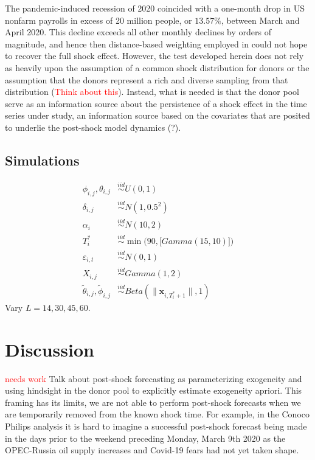 \documentclass[11pt]{article}
\def\mbf#1{\mathbf{#1}} %
\newcommand{\simiid}{\stackrel{iid}{\sim}} %
\theoremstyle{definition}
\begin{document}
The pandemic-induced recession of 2020 coincided with a one-month drop in US nonfarm payrolls in excess of 20 million people, or $13.57\%$, between March and April 2020.  This decline exceeds all other monthly declines by orders of magnitude, and hence then distance-based weighting employed in \citep{lin2021minimizing} could not hope to recover the full shock effect.  However, the test developed herein does not rely as heavily upon the assumption of a common shock distribution for donors or the assumption that the donors represent a rich and diverse sampling from that distribution (\textcolor{red}{Think about this}).  Instead, what is needed is that the donor pool serve as an information source about the persistence of a shock effect in the time series under study, an information source based on the covariates that are posited to underlie the post-shock model dynamics (?).  


\subsection{Simulations}
\label{simulation}


\begin{align*}
	\phi_{i,j}, \theta_{i,j}  & \simiid U(0,1) \\ 
	\delta_{i,j} & \simiid N(1,0.5^2) \\
	\alpha_i & \simiid N(10, 2) \\
	T_i^* & \simiid \min\Big(90, \big[Gamma(15,10)\big]\Big) \\
	\varepsilon_{i,t} & \simiid N(0,1)\\
	X_{i,j} & \simiid Gamma(1,2) \\
	\tilde{\theta}_{i,j},\tilde{\phi}_{i,j} & \simiid Beta(\|\mbf{x}_{i,T_i^*+1}\|,1)
\end{align*}
Vary $L = 14, 30, 45,60$.



\section{Discussion}

\textcolor{red}{needs work} Talk about post-shock forecasting as parameterizing exogeneity and using hindsight in the donor pool to explicitly estimate exogeneity apriori. This framing has its limits, we are not able to perform post-shock forecasts when we are temporarily removed from the known shock time. For example, in the Conoco Philips analysis it is hard to imagine a successful post-shock forecast being made in the days prior to the weekend preceding Monday, March 9th 2020 as the OPEC-Russia oil supply increases and Covid-19 fears had not yet taken shape.
\end{document}
